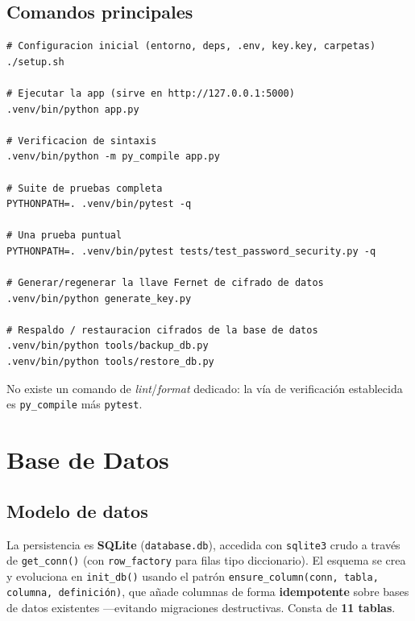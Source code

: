 \documentclass[10pt,letterpaper]{report}
\begin{document}
\section{Comandos principales}
\begin{lstlisting}[style=bash]
# Configuracion inicial (entorno, deps, .env, key.key, carpetas)
./setup.sh

# Ejecutar la app (sirve en http://127.0.0.1:5000)
.venv/bin/python app.py

# Verificacion de sintaxis
.venv/bin/python -m py_compile app.py

# Suite de pruebas completa
PYTHONPATH=. .venv/bin/pytest -q

# Una prueba puntual
PYTHONPATH=. .venv/bin/pytest tests/test_password_security.py -q

# Generar/regenerar la llave Fernet de cifrado de datos
.venv/bin/python generate_key.py

# Respaldo / restauracion cifrados de la base de datos
.venv/bin/python tools/backup_db.py
.venv/bin/python tools/restore_db.py
\end{lstlisting}

No existe un comando de \emph{lint}/\emph{format} dedicado: la v\'ia de verificaci\'on establecida es
\texttt{py\_compile} m\'as \texttt{pytest}.

\chapter{Base de Datos}

\section{Modelo de datos}
La persistencia es \textbf{SQLite} (\texttt{database.db}), accedida con \texttt{sqlite3} crudo a
trav\'es de \texttt{get\_conn()} (con \texttt{row\_factory} para filas tipo diccionario). El esquema
se crea y evoluciona en \texttt{init\_db()} usando el patr\'on \texttt{ensure\_column(conn, tabla,
columna, definici\'on)}, que a\~nade columnas de forma \textbf{idempotente} sobre bases de datos
existentes ---evitando migraciones destructivas. Consta de \textbf{11 tablas}.
\end{document}
